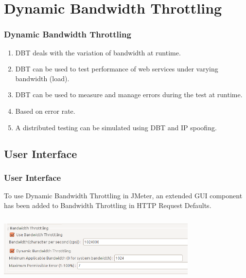 \documentclass[12pt]{beamer}
\begin{document}
\section{Dynamic Bandwidth Throttling}
\begin{frame}[c]
\frametitle{Dynamic Bandwidth Throttling}
\begin{enumerate}
 \item <+-| alert@+>DBT deals with the variation of bandwidth at runtime.
 \item <+-| alert@+>DBT can be used to test performance of web services under varying bandwidth (load).
 \item <+-| alert@+>DBT can be used to measure and manage errors during the test at runtime.
 \item <+-| alert@+>Based on error rate.
 \item <+-| alert@+>A distributed testing can be simulated using DBT and IP spoofing.
\end{enumerate}

% 
 \end{frame}
 
 \subsection{User Interface}
  \begin{frame}[c]
    \frametitle{User Interface}
    \begin{flushleft}
     
    To use Dynamic Bandwidth Throttling in JMeter, an extended GUI component has been added to Bandwidth Throttling in HTTP Request Defaults.
    \end{flushleft}

     \centering
    \includegraphics[width=10cm, height=3.5cm]{images/dbt1}
       
  \end{frame}
  
\end{document}
